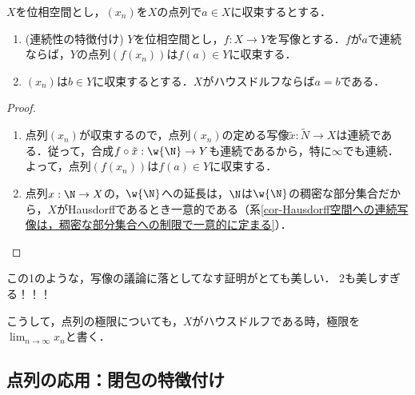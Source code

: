 \documentclass[uplatex,dvipdfmx]{jsreport}
\begin{document}
\begin{corollary}[連続性の極限の言葉による特徴付け]\label{cor-characterization-of-continuousness-in-terms-of-limits}
    $X$を位相空間とし，$(x_n)$を$X$の点列で$a\in X$に収束するとする．
    \begin{enumerate}
        \item (連続性の特徴付け) $Y$を位相空間とし，$f:X\to Y$を写像とする．$f$が$a$で連続ならば，$Y$の点列$(f(x_n))$は$f(a)\in Y$に収束する．
        \item $(x_n)$は$b\in Y$に収束するとする．$X$がハウスドルフならば$a=b$である．
    \end{enumerate}
\end{corollary}
\begin{proof}\mbox{}
    \begin{enumerate}
        \item 点列$(x_n)$が収束するので，点列$(x_n)$の定める写像$\tilde{x}:\widetilde{N}\to X$は連続である．従って，合成$f\circ\tilde{x}:\w{\N}\to Y$も連続であるから，特に$\infty$でも連続．よって，点列$(f(x_n))$は$f(a)\in Y$に収束する．
        \item 点列$x:\N\to X$の，$\w{\N}$への延長は，$\N$は$\w{\N}$の稠密な部分集合だから，$X$がHausdorffであるとき一意的である（系\ref{cor-Hausdorff空間への連続写像は，稠密な部分集合への制限で一意的に定まる}）．
    \end{enumerate}
\end{proof}
\begin{remarks}
    この1のような，写像の議論に落としてなす証明がとても美しい．
    2も美しすぎる！！！
\end{remarks}

こうして，点列の極限についても，$X$がハウスドルフである時，極限を$\lim_{n\to\infty}x_n$と書く．

\subsection{点列の応用：閉包の特徴付け}
\end{document}
